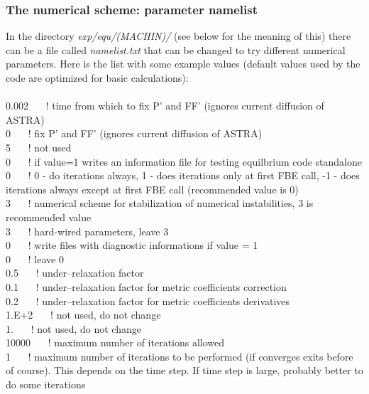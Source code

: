 \subsubsection{The numerical scheme: parameter namelist}
In the directory {\it exp/equ/(MACHIN)/} (see below for the meaning of this) there can be a file called {\it 
namelist.txt} that can be changed to try different numerical parameters. Here is the list with some example values 
(default values used by the code are optimized for basic calculations):
\\\\
0.002 $\:\:\:\:\:$     ! time from which to fix P' and FF' (ignores current diffusion of ASTRA)\\
0      $\:\:\:\:\:$    ! fix P' and FF' (ignores current diffusion of ASTRA)\\
5    $\:\:\:\:\:$      ! not used\\
0     $\:\:\:\:\:$      ! if value=1 writes an information file for testing equilbrium code standalone\\
0   $\:\:\:\:\:$         ! 0 - do iterations always, 1 - does iterations only at first FBE call, -1 - does iterations always except at first FBE call (recommended value is 0)\\
3   $\:\:\:\:\:$          ! numerical scheme for stabilization of numerical instabilities, 3 is recommended value\\
3    $\:\:\:\:\:$      ! hard-wired parameters, leave 3\\
0    $\:\:\:\:\:$      ! write files with diagnostic informations if value = 1\\
0    $\:\:\:\:\:$     ! leave 0\\
0.5   $\:\:\:\:\:$      ! under--relaxation factor\\
0.1    $\:\:\:\:\:$     ! under--relaxation factor for metric coefficients correction\\
0.2   $\:\:\:\:\:$    ! under--relaxation factor for metric coefficients derivatives\\
1.E+2  $\:\:\:\:\:$   ! not used, do not change\\
1.   $\:\:\:\:\:$      ! not used, do not change\\
10000   $\:\:\:\:\:$   ! maximum number of iterations allowed\\
1    $\:\:\:\:\:$    ! maximum number of iterations to be performed (if converges exits before of course). This depends on the time step. If time step is large, probably better to do some iterations\\

